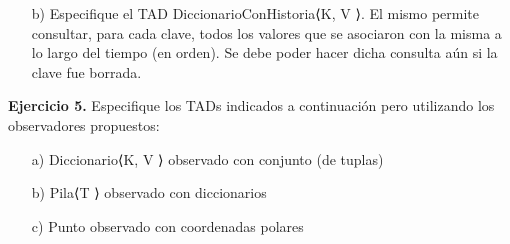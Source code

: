 \documentclass{article}
\newenvironment{tad}[1]{
	\paragraph{} \vspace*{-4mm}
	\newcommand{\obs}[2]{\texttt{obs} ##1 : ##2}

	\vspace{1ex}
	\texttt{TAD} \textit{#1} $\{$
	\par
	\tocarEspacios
}
{

\hspace{2.5mm} $\}$
\vspace{2ex}
}
\begin{document}
\begin{itemize}
\begin{tad}{Diccionario$\langle$K, V$\rangle$}
        \begin{proc}{borrar}{\Inout d: Diccionario$\langle$K, V$\rangle$, \In k: K}{}
            \end{proc}
        
    \end{tad}

    \item [b)] Especifique el TAD DiccionarioConHistoria⟨K, V ⟩. El mismo permite consultar, para cada clave, todos los valores que se
    asociaron con la misma a lo largo del tiempo (en orden). Se debe poder hacer dicha consulta a\'un si la clave fue borrada.
\end{itemize}

\textbf{Ejercicio 5.} Especifique los TADs indicados a continuaci\'on pero utilizando los observadores propuestos:
\begin{itemize}
    \item [a)] Diccionario⟨K, V ⟩ observado con conjunto (de tuplas)
    \item [b)] Pila⟨T ⟩ observado con diccionarios
    \item [c)] Punto observado con coordenadas polares
\end{itemize}
\end{document}
